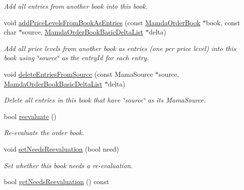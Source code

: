 \begin{CompactItemize}
\begin{CompactList}\small\item\em Add all entries from another book into this book. \item\end{CompactList}\item 
void \hyperlink{classWombat_1_1MamdaOrderBook_92ae9d6386ae5ea2dd72c4a1fd729bcd}{add\-Price\-Levels\-From\-Book\-As\-Entries} (const \hyperlink{classWombat_1_1MamdaOrderBook}{Mamda\-Order\-Book} $\ast$book, const char $\ast$source, \hyperlink{classWombat_1_1MamdaOrderBookBasicDeltaList}{Mamda\-Order\-Book\-Basic\-Delta\-List} $\ast$delta)
\begin{CompactList}\small\item\em Add all price levels from another book as entries (one per price level) into this book using \char`\"{}source\char`\"{} as the entry\-Id for each entry. \item\end{CompactList}\item 
void \hyperlink{classWombat_1_1MamdaOrderBook_475d7893f41395c0f4ba06a503ab114b}{delete\-Entries\-From\-Source} (const Mama\-Source $\ast$source, \hyperlink{classWombat_1_1MamdaOrderBookBasicDeltaList}{Mamda\-Order\-Book\-Basic\-Delta\-List} $\ast$delta)
\begin{CompactList}\small\item\em Delete all entries in this book that have \char`\"{}source\char`\"{} as its Mama\-Source. \item\end{CompactList}\item 
bool \hyperlink{classWombat_1_1MamdaOrderBook_3e3bf06096ebc9a847bd72274fec13df}{reevaluate} ()
\begin{CompactList}\small\item\em Re-evaluate the order book. \item\end{CompactList}\item 
void \hyperlink{classWombat_1_1MamdaOrderBook_8431faa01427b17fc25efa1745c7a006}{set\-Needs\-Reevaluation} (bool need)
\begin{CompactList}\small\item\em Set whether this book needs a re-evaluation. \item\end{CompactList}\item 
bool \hyperlink{classWombat_1_1MamdaOrderBook_70f8d27116c1cf0cecb2ed088d46cc31}{get\-Needs\-Reevaluation} () const 

\end{CompactItemize}
